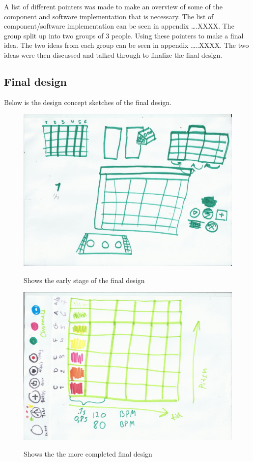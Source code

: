 \setlength{\parindent}{10ex}
A list of different pointers was made to make an overview of some of the component and software implementation that is necessary. 
The list of component/software implementation can be seen in appendix ….XXXX. 
The group split up into two groups of 3 people. Using these pointers to make a final idea. 
The two ideas from each group can be seen in appendix …..XXXX. 
The two ideas were then discussed and talked through to finalize the final design. 

\subsection{Final design}
Below is the design concept sketches of the final design. 

\begin{figure}[H]
	\centering
	\includegraphics[width=0.7\linewidth]{figure/Design/sketchOne}
	\label{fig:sketchOne}
	\caption{Shows the early stage of the final design}
	
\end{figure}

\begin{figure}[H]
	\centering
	\includegraphics[width=0.7\linewidth]{figure/Design/sketchTwo}
	\label{fig:sketchTwo}
	\caption{Shows the the more completed final design}
	
\end{figure}

